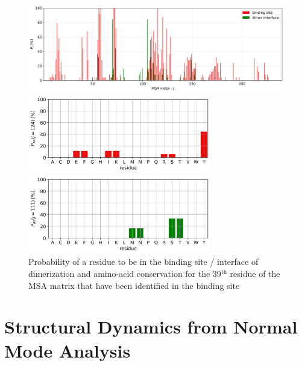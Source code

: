 \begin{figure}[H]
	\label{BS & DI Proba}
	\center\includegraphics[width = 16cm]{figures/MSA_Proba.jpg} %
	\begin{minipage}{.48\linewidth}
		\centering
		\includegraphics[width = 8cm]{figures/amino-acid_conservation_BS_j=124.jpg}
	\end{minipage}	
	\begin{minipage}{.48\linewidth}
		\includegraphics[width = 8cm]{figures/amino-acid_conservation_DI_j=111.jpg}
	\end{minipage}	
	\caption{Probability of a residue to be in the binding site / interface of dimerization and amino-acid conservation for the 39$^{\text{th}}$ residue of the MSA matrix that have been identified in the binding site}
\end{figure}
\section{Structural Dynamics from Normal Mode Analysis}

